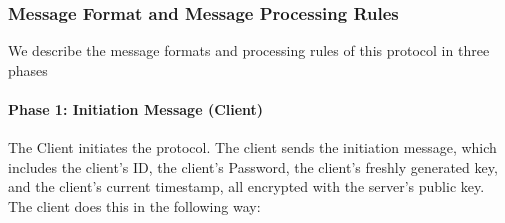 \documentclass[12pt]{article}
\begin{document}
\subsubsection{Message Format and Message Processing Rules}

We describe the message formats and processing rules of this protocol in three phases

\paragraph{Phase 1: Initiation Message (Client)}

The Client initiates the protocol. The client sends the initiation message, which includes the client’s ID, the client’s Password, the client’s freshly generated key, and the client’s current timestamp, all encrypted with the server’s public key. The client does this in the following way:
\end{document}
